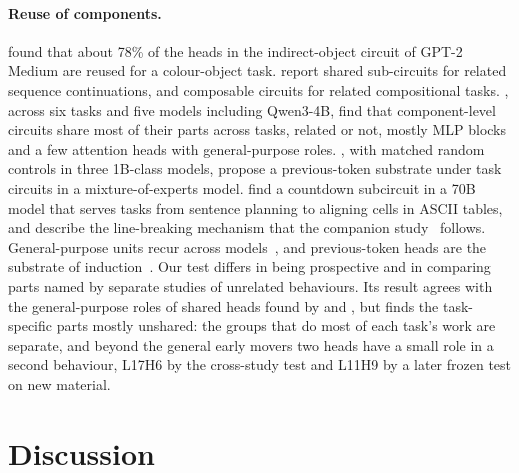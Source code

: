 \documentclass[11pt]{article}
\newcommand{\hd}[2]{L#1H#2}
\begin{document}
\paragraph{Reuse of components.} \citet{merullo2024reuse} found that about 78\% of the heads in the indirect-object circuit of GPT-2 Medium are reused for a colour-object task. \citet{lan2024sequence} report shared sub-circuits for related sequence continuations, and \citet{mondorf2025compositions} composable circuits for related compositional tasks. \citet{li2026circuits}, across six tasks and five models including Qwen3-4B, find that component-level circuits share most of their parts across tasks, related or not, mostly MLP blocks and a few attention heads with general-purpose roles. \citet{xu2026selectivity}, with matched random controls in three 1B-class models, propose a previous-token substrate under task circuits in a mixture-of-experts model. \citet{dunefsky2026countdown} find a countdown subcircuit in a 70B model that serves tasks from sentence planning to aligning cells in ASCII tables, and \citet{gurnee2026manifolds} describe the line-breaking mechanism that the companion study~\citep{jeevash2026linebreaking} follows. General-purpose units recur across models~\citep{gurnee2024universal}, and previous-token heads are the substrate of induction~\citep{olsson2022induction}. Our test differs in being prospective and in comparing parts named by separate studies of unrelated behaviours. Its result agrees with the general-purpose roles of shared heads found by \citet{li2026circuits} and \citet{xu2026selectivity}, but finds the task-specific parts mostly unshared: the groups that do most of each task's work are separate, and beyond the general early movers two heads have a small role in a second behaviour, \hd{17}{6} by the cross-study test and \hd{11}{9} by a later frozen test on new material.

\section{Discussion}
\label{sec:discussion}
\end{document}
